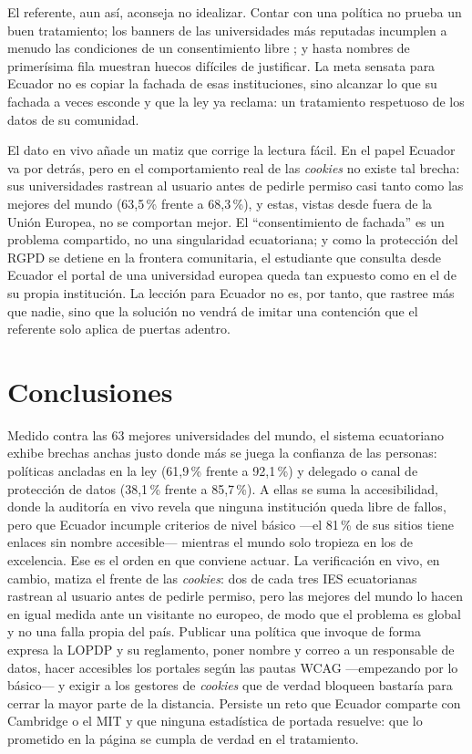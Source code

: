 \documentclass[pdflatex,sn-basic,Numbered]{sn-jnl}
\theoremstyle{thmstyleone}
\theoremstyle{thmstyletwo}
\theoremstyle{thmstylethree}
\begin{document}
El referente, aun así, aconseja no idealizar. Contar con una política no prueba un buen tratamiento; los banners de las universidades más reputadas incumplen a menudo las condiciones de un consentimiento libre \citep{nouwens2020dark,gray2021dark}; y hasta nombres de primerísima fila muestran huecos difíciles de justificar. La meta sensata para Ecuador no es copiar la fachada de esas instituciones, sino alcanzar lo que su fachada a veces esconde y que la ley ya reclama: un tratamiento respetuoso de los datos de su comunidad.

El dato en vivo añade un matiz que corrige la lectura fácil. En el papel Ecuador va por detrás, pero en el comportamiento real de las \emph{cookies} no existe tal brecha: sus universidades rastrean al usuario antes de pedirle permiso casi tanto como las mejores del mundo (63,5\,\% frente a 68,3\,\%), y estas, vistas desde fuera de la Unión Europea, no se comportan mejor. El ``consentimiento de fachada'' es un problema compartido, no una singularidad ecuatoriana; y como la protección del RGPD se detiene en la frontera comunitaria, el estudiante que consulta desde Ecuador el portal de una universidad europea queda tan expuesto como en el de su propia institución. La lección para Ecuador no es, por tanto, que rastree más que nadie, sino que la solución no vendrá de imitar una contención que el referente solo aplica de puertas adentro.

\section{Conclusiones}\label{sec:conclusiones}
Medido contra las 63 mejores universidades del mundo, el sistema ecuatoriano exhibe brechas anchas justo donde más se juega la confianza de las personas: políticas ancladas en la ley (61,9\,\% frente a 92,1\,\%) y delegado o canal de protección de datos (38,1\,\% frente a 85,7\,\%). A ellas se suma la accesibilidad, donde la auditoría en vivo revela que ninguna institución queda libre de fallos, pero que Ecuador incumple criterios de nivel básico ---el 81\,\% de sus sitios tiene enlaces sin nombre accesible--- mientras el mundo solo tropieza en los de excelencia. Ese es el orden en que conviene actuar. La verificación en vivo, en cambio, matiza el frente de las \emph{cookies}: dos de cada tres IES ecuatorianas rastrean al usuario antes de pedirle permiso, pero las mejores del mundo lo hacen en igual medida ante un visitante no europeo, de modo que el problema es global y no una falla propia del país. Publicar una política que invoque de forma expresa la LOPDP y su reglamento, poner nombre y correo a un responsable de datos, hacer accesibles los portales según las pautas WCAG \citep{wcag21} ---empezando por lo básico--- y exigir a los gestores de \emph{cookies} que de verdad bloqueen bastaría para cerrar la mayor parte de la distancia. Persiste un reto que Ecuador comparte con Cambridge o el MIT y que ninguna estadística de portada resuelve: que lo prometido en la página se cumpla de verdad en el tratamiento.
\end{document}
